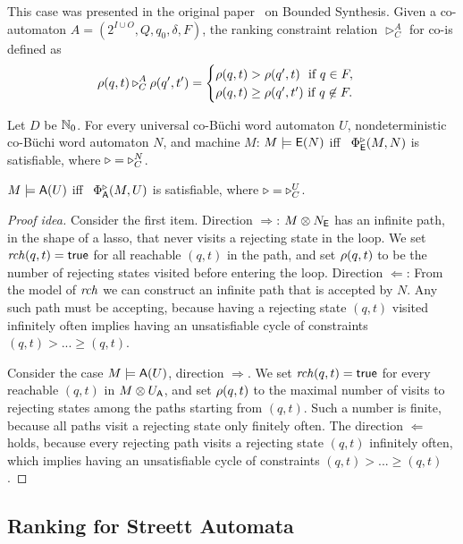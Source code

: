 This case was presented in the original paper~\cite{BS} on Bounded Synthesis.
Given a co-\buchi automaton $A = (2^{I\cup O}, Q, q_0, \delta, F)$,
the ranking constraint relation $\triangleright^A_C$
for co-\buchi is defined as
\begin{equation}\label{eq:rank:cobuchi}
\rho(q,t) \triangleright^A_C \rho(q',t') =
\begin{cases}
  \rho(q,t)>\rho(q',t) \text{~~if } q \in F,\\
  \rho(q,t)\geq\rho(q',t') \text{ if } q \not\in F.
\end{cases}
\end{equation}

\begin{theorem}[\cite{BS}]
Let $D$ be $\mathbb{N}_0$.
For every universal co-B\"uchi word automaton $U$,
nondeterministic co-B\"uchi word automaton $N$, and
machine $M$:
\li
\- $M \models {\ensuremath{\operatorname{\mathsf{E}}}}(N)$
   iff~
   $\Phi^{\triangleright}_{\operatorname{\mathsf{E}}}(M,N)$ is satisfiable,
   where $\triangleright=\triangleright^N_C$.

\- $M \models {\ensuremath{\operatorname{\mathsf{A}}}}(U)$
   iff~
   $\Phi^{\triangleright}_{\operatorname{\mathsf{A}}}(M,U)$ is satisfiable,
   where $\triangleright=\triangleright^U_C$.
\il
\end{theorem}
\begin{proof}[Proof idea]
Consider the first item.
Direction $\Rightarrow$:
$M \otimes N_{\operatorname{\mathsf{E}}}$ has an infinite path, in the shape of a lasso,
that never visits a rejecting state in the loop.
We set $\mathit{rch}(q,t)=\textsf{true}$ for all reachable $(q,t)$ in the path,
and set $\rho(q,t)$ to be the number of rejecting states visited before entering the loop.
Direction $\Leftarrow$:
From the model of $\mathit{rch}$ we can construct an infinite path that is accepted by $N$.
Any such path must be accepting, 
because having a rejecting state $(q,t)$ visited infinitely often
implies having an unsatisfiable cycle of constraints $(q,t) > ... \geq (q,t)$.

Consider the case $M \models {\ensuremath{\operatorname{\mathsf{A}}}}(U)$, direction $\Rightarrow$.
We set $\mathit{rch}(q,t)=\textsf{true}$ for every reachable $(q,t)$ in $M \otimes U_{\operatorname{\mathsf{A}}}$,
and set $\rho(q,t)$ to the maximal number of visits to rejecting states among the paths starting from $(q,t)$.
Such a number is finite,
because all paths visit a rejecting state only finitely often.
The direction $\Leftarrow$ holds,
because every rejecting path visits a rejecting state $(q,t)$ infinitely often,
which implies having an unsatisfiable cycle of constraints $(q,t) > ... \geq (q,t)$.
\end{proof}


\subsection{Ranking for Streett Automata}

